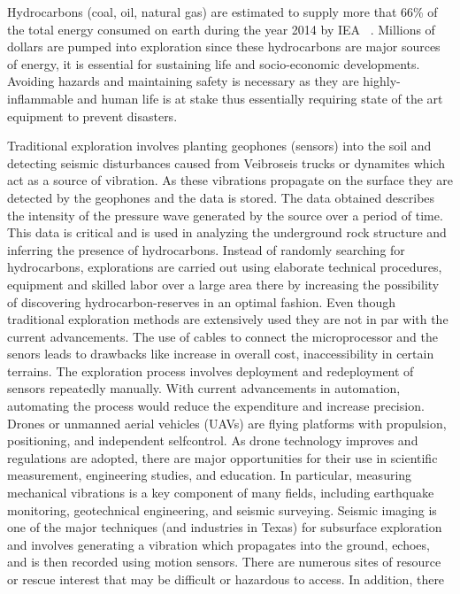 Hydrocarbons (coal, oil, natural gas) are estimated to
supply more that 66\% of the total energy consumed on earth
during the year 2014 by IEA ~\cite{bektas2006multiple}.
 Millions of dollars are pumped into exploration since these hydrocarbons are major sources of energy, it is essential for sustaining life and socio-economic developments. Avoiding hazards and maintaining safety is necessary as they are highly-inflammable and human life is at stake thus essentially requiring state of the art equipment to prevent disasters.

Traditional exploration involves planting geophones (sensors)
into the soil and detecting seismic disturbances caused
from Veibroseis trucks or dynamites which act as a source of
vibration. As these vibrations propagate on the surface they
are detected by the geophones and the data is stored. The
data obtained describes the intensity of the pressure wave
generated by the source over a period of time. This data
is critical and is used in analyzing the underground rock
structure and inferring the presence of hydrocarbons. Instead of randomly searching for hydrocarbons, explorations are carried out using elaborate technical procedures, equipment and skilled labor over a large area there by increasing the possibility of discovering hydrocarbon-reserves in an optimal fashion. 
Even though traditional exploration methods are extensively used they are not in par with the current advancements. The use of cables to connect the microprocessor and the senors leads to drawbacks like increase in overall cost, inaccessibility in certain terrains. The exploration process involves deployment and redeployment of sensors repeatedly manually. With current advancements in automation, automating the process would reduce the expenditure and increase precision.
Drones or unmanned aerial vehicles (UAVs) are flying
platforms with propulsion, positioning, and independent selfcontrol.
As drone technology improves and regulations are
adopted, there are major opportunities for their use in scientific
measurement, engineering studies, and education. In particular,
measuring mechanical vibrations is a key component of many
fields, including earthquake monitoring, geotechnical engineering,
and seismic surveying. Seismic imaging is one of the
major techniques (and industries in Texas) for subsurface exploration
and involves generating a vibration which propagates
into the ground, echoes, and is then recorded using motion
sensors. There are numerous sites of resource or rescue interest
that may be difficult or hazardous to access. In addition, there
